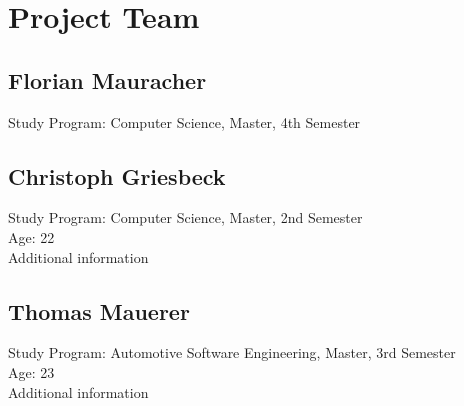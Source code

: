 \section{Project Team}
\subsection{Florian Mauracher}
Study Program: Computer Science, Master, 4th Semester \\

\subsection{Christoph Griesbeck}
Study Program: Computer Science, Master, 2nd Semester \\
Age: 22 \\
Additional information 

\subsection{Thomas Mauerer}
Study Program: Automotive Software Engineering, Master, 3rd Semester \\
Age: 23 \\
Additional information 
